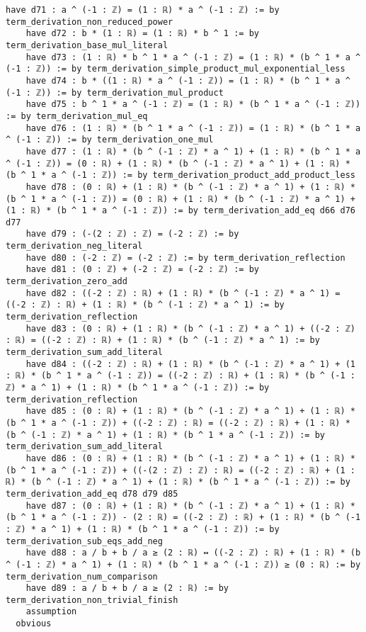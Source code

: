 \documentclass{article}
\begin{document}
\begin{tcolorbox}[colback=white!10, width=\linewidth]
\begin{lstlisting}[language=Lean4]
    have d71 : a ^ (-1 : ℤ) = (1 : ℝ) * a ^ (-1 : ℤ) := by term_derivation_non_reduced_power
    have d72 : b * (1 : ℝ) = (1 : ℝ) * b ^ 1 := by term_derivation_base_mul_literal
    have d73 : (1 : ℝ) * b ^ 1 * a ^ (-1 : ℤ) = (1 : ℝ) * (b ^ 1 * a ^ (-1 : ℤ)) := by term_derivation_simple_product_mul_exponential_less
    have d74 : b * ((1 : ℝ) * a ^ (-1 : ℤ)) = (1 : ℝ) * (b ^ 1 * a ^ (-1 : ℤ)) := by term_derivation_mul_product
    have d75 : b ^ 1 * a ^ (-1 : ℤ) = (1 : ℝ) * (b ^ 1 * a ^ (-1 : ℤ)) := by term_derivation_mul_eq
    have d76 : (1 : ℝ) * (b ^ 1 * a ^ (-1 : ℤ)) = (1 : ℝ) * (b ^ 1 * a ^ (-1 : ℤ)) := by term_derivation_one_mul
    have d77 : (1 : ℝ) * (b ^ (-1 : ℤ) * a ^ 1) + (1 : ℝ) * (b ^ 1 * a ^ (-1 : ℤ)) = (0 : ℝ) + (1 : ℝ) * (b ^ (-1 : ℤ) * a ^ 1) + (1 : ℝ) * (b ^ 1 * a ^ (-1 : ℤ)) := by term_derivation_product_add_product_less
    have d78 : (0 : ℝ) + (1 : ℝ) * (b ^ (-1 : ℤ) * a ^ 1) + (1 : ℝ) * (b ^ 1 * a ^ (-1 : ℤ)) = (0 : ℝ) + (1 : ℝ) * (b ^ (-1 : ℤ) * a ^ 1) + (1 : ℝ) * (b ^ 1 * a ^ (-1 : ℤ)) := by term_derivation_add_eq d66 d76 d77
    have d79 : (-(2 : ℤ) : ℤ) = (-2 : ℤ) := by term_derivation_neg_literal
    have d80 : (-2 : ℤ) = (-2 : ℤ) := by term_derivation_reflection
    have d81 : (0 : ℤ) + (-2 : ℤ) = (-2 : ℤ) := by term_derivation_zero_add
    have d82 : ((-2 : ℤ) : ℝ) + (1 : ℝ) * (b ^ (-1 : ℤ) * a ^ 1) = ((-2 : ℤ) : ℝ) + (1 : ℝ) * (b ^ (-1 : ℤ) * a ^ 1) := by term_derivation_reflection
    have d83 : (0 : ℝ) + (1 : ℝ) * (b ^ (-1 : ℤ) * a ^ 1) + ((-2 : ℤ) : ℝ) = ((-2 : ℤ) : ℝ) + (1 : ℝ) * (b ^ (-1 : ℤ) * a ^ 1) := by term_derivation_sum_add_literal
    have d84 : ((-2 : ℤ) : ℝ) + (1 : ℝ) * (b ^ (-1 : ℤ) * a ^ 1) + (1 : ℝ) * (b ^ 1 * a ^ (-1 : ℤ)) = ((-2 : ℤ) : ℝ) + (1 : ℝ) * (b ^ (-1 : ℤ) * a ^ 1) + (1 : ℝ) * (b ^ 1 * a ^ (-1 : ℤ)) := by term_derivation_reflection
    have d85 : (0 : ℝ) + (1 : ℝ) * (b ^ (-1 : ℤ) * a ^ 1) + (1 : ℝ) * (b ^ 1 * a ^ (-1 : ℤ)) + ((-2 : ℤ) : ℝ) = ((-2 : ℤ) : ℝ) + (1 : ℝ) * (b ^ (-1 : ℤ) * a ^ 1) + (1 : ℝ) * (b ^ 1 * a ^ (-1 : ℤ)) := by term_derivation_sum_add_literal
    have d86 : (0 : ℝ) + (1 : ℝ) * (b ^ (-1 : ℤ) * a ^ 1) + (1 : ℝ) * (b ^ 1 * a ^ (-1 : ℤ)) + ((-(2 : ℤ) : ℤ) : ℝ) = ((-2 : ℤ) : ℝ) + (1 : ℝ) * (b ^ (-1 : ℤ) * a ^ 1) + (1 : ℝ) * (b ^ 1 * a ^ (-1 : ℤ)) := by term_derivation_add_eq d78 d79 d85
    have d87 : (0 : ℝ) + (1 : ℝ) * (b ^ (-1 : ℤ) * a ^ 1) + (1 : ℝ) * (b ^ 1 * a ^ (-1 : ℤ)) - (2 : ℝ) = ((-2 : ℤ) : ℝ) + (1 : ℝ) * (b ^ (-1 : ℤ) * a ^ 1) + (1 : ℝ) * (b ^ 1 * a ^ (-1 : ℤ)) := by term_derivation_sub_eqs_add_neg
    have d88 : a / b + b / a ≥ (2 : ℝ) ↔ ((-2 : ℤ) : ℝ) + (1 : ℝ) * (b ^ (-1 : ℤ) * a ^ 1) + (1 : ℝ) * (b ^ 1 * a ^ (-1 : ℤ)) ≥ (0 : ℝ) := by term_derivation_num_comparison
    have d89 : a / b + b / a ≥ (2 : ℝ) := by term_derivation_non_trivial_finish
    assumption
  obvious

\end{lstlisting}
\end{tcolorbox}
\end{document}
